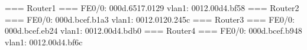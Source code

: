 === Router1 ===
FE0/0: 000d.6517.0129
vlan1: 0012.00d4.bf58
=== Router2 ===
FE0/0: 000d.bcef.b1a3
vlan1: 0012.0120.245c
=== Router3 ===
FE0/0: 000d.bcef.eb24
vlan1: 0012.00d4.bdb0
=== Router4 ===
FE0/0: 000d.bcef.b948
vlan1: 0012.00d4.bf6c
